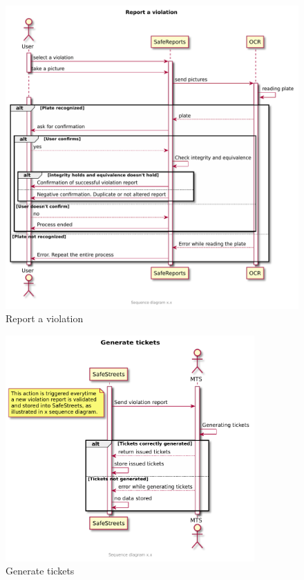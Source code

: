 \documentclass[a4paper]{article}
\begin{document}
\begin{figure}[H]
\centering
\includegraphics[width=\textwidth]{sequence_diagram_report}
\caption{Report a violation}
\end{figure}

\begin{figure}[H]
\centering
\includegraphics[width=0.85\textwidth]{sequence_tickets_generation}
\caption{Generate tickets}
\end{figure}
\end{document}
